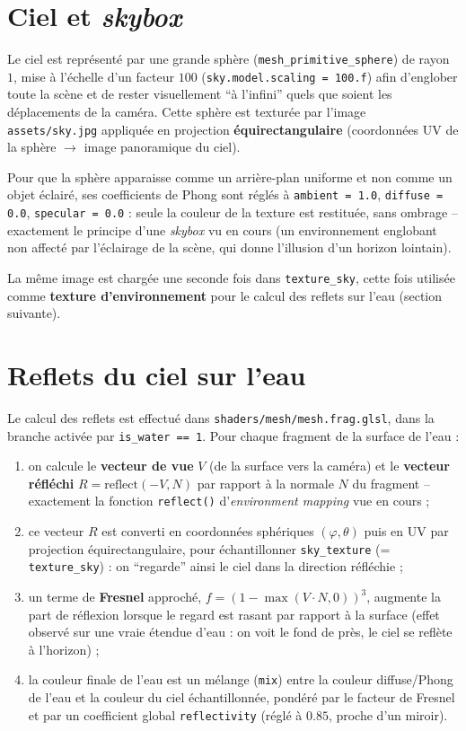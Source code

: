 \documentclass[11pt,a4paper]{article}
\begin{document}
\section{Ciel et \emph{skybox}}
\label{sec:skybox}

Le ciel est représenté par une grande sphère
(\texttt{mesh\_primitive\_sphere}) de rayon $1$, mise à l'échelle d'un
facteur $100$ (\texttt{sky.model.scaling = 100.f}) afin d'englober
toute la scène et de rester visuellement ``à l'infini'' quels que
soient les déplacements de la caméra. Cette sphère est texturée par
l'image \texttt{assets/sky.jpg} appliquée en projection
\textbf{équirectangulaire} (coordonnées UV de la sphère $\to$ image
panoramique du ciel).

Pour que la sphère apparaisse comme un arrière-plan uniforme et non
comme un objet éclairé, ses coefficients de Phong sont réglés à
\texttt{ambient = 1.0}, \texttt{diffuse = 0.0}, \texttt{specular = 0.0} :
seule la couleur de la texture est restituée, sans ombrage --
exactement le principe d'une \emph{skybox} vu en cours (un environnement
englobant non affecté par l'éclairage de la scène, qui donne l'illusion
d'un horizon lointain).

La même image est chargée une seconde fois dans \texttt{texture\_sky},
cette fois utilisée comme \textbf{texture d'environnement} pour le
calcul des reflets sur l'eau (section suivante).

\section{Reflets du ciel sur l'eau}
\label{sec:reflets}

Le calcul des reflets est effectué dans
\texttt{shaders/mesh/mesh.frag.glsl}, dans la branche activée par
\texttt{is\_water == 1}. Pour chaque fragment de la surface de l'eau :

\begin{enumerate}
    \item on calcule le \textbf{vecteur de vue} $V$ (de la surface vers
    la caméra) et le \textbf{vecteur réfléchi} $R = \text{reflect}(-V,
    N)$ par rapport à la normale $N$ du fragment -- exactement la
    fonction \texttt{reflect()} d'\emph{environment mapping} vue en
    cours ;
    \item ce vecteur $R$ est converti en coordonnées sphériques
    $(\varphi,\theta)$ puis en UV par projection équirectangulaire,
    pour échantillonner \texttt{sky\_texture} (= \texttt{texture\_sky})
    : on ``regarde'' ainsi le ciel dans la direction réfléchie ;
    \item un terme de \textbf{Fresnel} approché,
    $f = (1-\max(V\cdot N,0))^3$, augmente la part de réflexion lorsque
    le regard est rasant par rapport à la surface (effet observé sur
    une vraie étendue d'eau : on voit le fond de près, le ciel se
    reflète à l'horizon) ;
    \item la couleur finale de l'eau est un mélange
    (\texttt{mix}) entre la couleur diffuse/Phong de l'eau et la
    couleur du ciel échantillonnée, pondéré par le facteur de Fresnel et
    par un coefficient global \texttt{reflectivity} (réglé à $0.85$,
    proche d'un miroir).
\end{enumerate}
\end{document}

